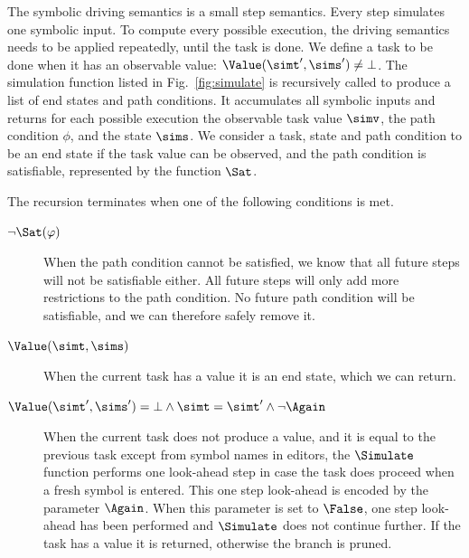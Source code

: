The symbolic driving semantics is a small step semantics.
Every step simulates one symbolic input.
To compute every possible execution, the driving semantics needs to be applied repeatedly, until the task is done.
We define a task to be done when it has an observable value: $\Value(\simt', \sims') \neq \bot$.
The simulation function listed in Fig.~\ref{fig:simulate} is recursively called to produce a list of end states and path conditions.
It accumulates all symbolic inputs and returns for each possible execution the observable task value $\simv$, the path condition $\phi$, and the state $\sims$.
We consider a task, state and path condition to be an end state if the task value can be observed,
and the path condition is satisfiable, represented by the function $\Sat$.

The recursion terminates when one of the following conditions is met.

\begin{description}
  \item[$\neg\Sat(\phi)$]
    When the path condition cannot be satisfied, we know that all future steps will not be satisfiable either.
    All future steps will only add more restrictions to the path condition.
    No future path condition will be satisfiable, and we can therefore safely remove it.

  \item[$\Value(\simt,\sims)$]
    When the current task has a value it is an end state, which we can return.

  \item[$\Value(\simt',\sims')=\bot\land \simt=\simt'\land \neg \Again$]
    When the current task does not produce a value, and it is equal to the previous task except from symbol names in editors, the $\Simulate$ function performs one look-ahead step in case the task does proceed when a fresh symbol is entered.
    This one step look-ahead is encoded by the parameter $\Again$.
    When this parameter is set to $\False$, one step look-ahead has been performed and $\Simulate$ does not continue further.
    If the task has a value it is returned, otherwise the branch is pruned.
\end{description}

